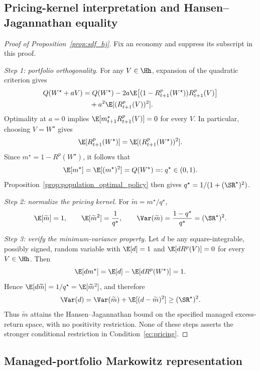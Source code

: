 \subsection{Pricing-kernel interpretation and Hansen--Jagannathan equality}
\label{app:sdf_hj}

\begin{proof}[Proof of Proposition~\ref{prop:sdf_hj}]
Fix an economy and suppress its subscript in this proof.

\medskip
\noindent\textit{Step 1: portfolio orthogonality.}
For any $V\in\Hh$, expansion of the quadratic criterion gives
\[
\begin{aligned}
Q(W^\star+aV)
&=Q(W^\star)
 -2a\E\!\left[
  (1-R^p_{t+1}(W^\star))R^p_{t+1}(V)
 \right]\\
&\quad+a^2\E[(R^p_{t+1}(V))^2].
\end{aligned}
\]
Optimality at $a=0$ implies
$\E[m^\star_{t+1}R^p_{t+1}(V)]=0$ for every $V$. In particular,
choosing $V=W^\star$ gives
\[
\E[R^p_{t+1}(W^\star)]
=
\E[(R^p_{t+1}(W^\star))^2].
\]
Since $m^\star=1-R^p(W^\star)$, it follows that
\[
\E[m^\star]
=\E[(m^\star)^2]
=Q(W^\star)
=:q^\star\in(0,1).
\]
Proposition~\ref{prop:population_optimal_policy} then gives
$q^\star=1/(1+(\SR^\star)^2)$.

\medskip
\noindent\textit{Step 2: normalize the pricing kernel.}
For $\widetilde m=m^\star/q^\star$,
\[
\E[\widetilde m]=1,
\qquad
\E[\widetilde m^2]=\frac{1}{q^\star},
\qquad
\Var(\widetilde m)=\frac{1-q^\star}{q^\star}=(\SR^\star)^2.
\]

\medskip
\noindent\textit{Step 3: verify the minimum-variance property.}
Let $d$ be any square-integrable, possibly signed, random variable with
$\E[d]=1$ and $\E[dR^p(V)]=0$ for every $V\in\Hh$.
Then
\[
\E[dm^\star]
=\E[d]-\E[dR^p(W^\star)]
=1.
\]
Hence $\E[d\widetilde m]=1/q^\star=\E[\widetilde m^2]$, and therefore
\[
\Var(d)
=
\Var(\widetilde m)+\E[(d-\widetilde m)^2]
\geq (\SR^\star)^2.
\]
Thus $\widetilde m$ attains the Hansen--Jagannathan bound on the specified
managed excess-return space, with no positivity restriction. None of these
steps asserts the stronger conditional restriction in
Condition~\ref{ec:pricing}.
\end{proof}

\subsection{Managed-portfolio Markowitz representation}
\label{app:managed_markowitz}

